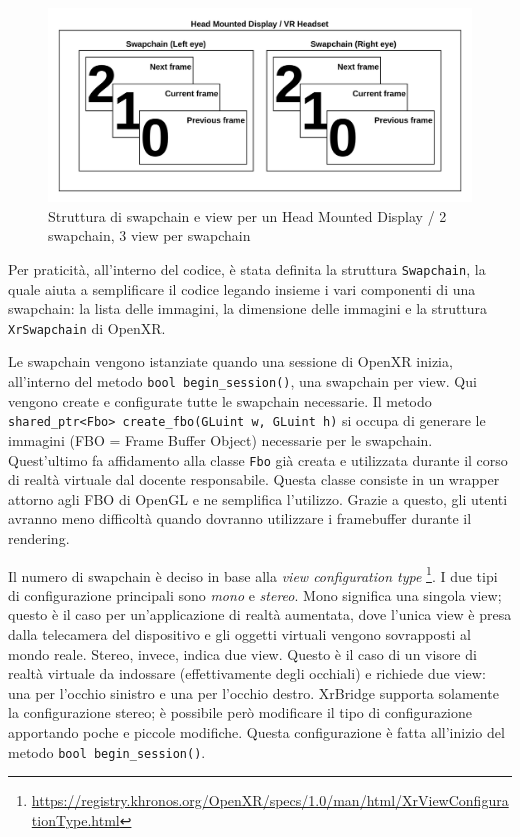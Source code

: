 \documentclass[twoside]{supsistudent}
\begin{document}
\begin{figure}[H]
  \caption{Struttura di swapchain e view per un Head Mounted Display / 2 swapchain, 3 view per swapchain}
  \centering
  \includegraphics[scale=0.3]{resources/swapchains.png}
\end{figure}

Per praticità, all'interno del codice, è stata definita la struttura \texttt{Swapchain}, la quale aiuta a semplificare il codice legando insieme i vari componenti di una swapchain: la lista delle immagini, la dimensione delle immagini e la struttura \texttt{XrSwapchain} di OpenXR.

Le swapchain vengono istanziate quando una sessione di OpenXR inizia, all'interno del metodo \texttt{bool begin\_session()}, una swapchain per view. Qui vengono create e configurate tutte le swapchain necessarie. Il metodo \texttt{shared\_ptr<Fbo> create\_fbo(GLuint w, GLuint h)} si occupa di generare le immagini (FBO = Frame Buffer Object) necessarie per le swapchain. Quest'ultimo fa affidamento alla classe \texttt{Fbo} già creata e utilizzata durante il corso di realtà virtuale dal docente responsabile. Questa classe consiste in un wrapper attorno agli FBO di OpenGL e ne semplifica l'utilizzo. Grazie a questo, gli utenti avranno meno difficoltà quando dovranno utilizzare i framebuffer durante il rendering.

Il numero di swapchain è deciso in base alla \textit{view configuration type} \footnote{\url{https://registry.khronos.org/OpenXR/specs/1.0/man/html/XrViewConfigurationType.html}}. I due tipi di configurazione principali sono \textit{mono} e \textit{stereo}. Mono significa una singola view; questo è il caso per un'applicazione di realtà aumentata, dove l'unica view è presa dalla telecamera del dispositivo e gli oggetti virtuali vengono sovrapposti al mondo reale. Stereo, invece, indica due view. Questo è il caso di un visore di realtà virtuale da indossare (effettivamente degli occhiali) e richiede due view: una per l'occhio sinistro e una per l'occhio destro. XrBridge supporta solamente la configurazione stereo; è possibile però modificare il tipo di configurazione apportando poche e piccole modifiche. Questa configurazione è fatta all'inizio del metodo \texttt{bool begin\_session()}.
\end{document}
